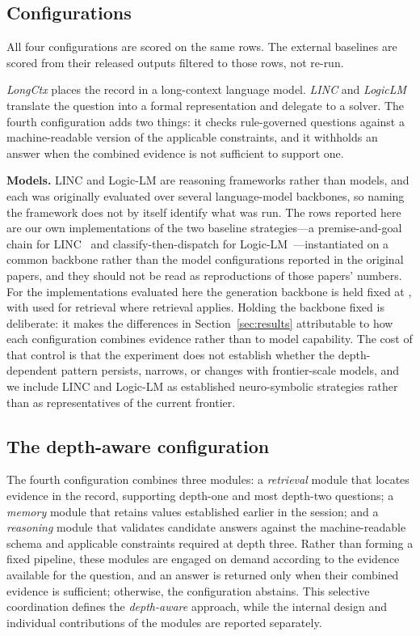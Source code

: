 \documentclass[conference]{IEEEtran}
\newcommand{\revg}[1]{\textcolor{reviewgreen}{#1}}
\begin{document}
\subsection{Configurations}
All four configurations are scored on the same \VerifiedN{} rows. The external
baselines are scored from their released outputs filtered to those rows, not
re-run.

\emph{LongCtx} places the record in a long-context language model.
\emph{LINC} and \emph{LogicLM} translate the question into a formal
representation and delegate to a solver. The fourth configuration adds two
things: it checks rule-governed questions against a machine-readable version of
the applicable constraints, and it withholds an answer when the combined
evidence is not sufficient to support one.

\textbf{Models.} LINC and Logic-LM are reasoning frameworks rather than
models, and each was originally evaluated over several language-model
backbones, so naming the framework does not by itself identify what was run.
The rows reported here are our own implementations of the two baseline strategies---a premise-and-goal chain for LINC~\cite{olausson2023linc} and classify-then-dispatch for Logic-LM~\cite{pan2023logiclm}---instantiated on a
common backbone rather than the model configurations reported in the original
papers, and they should not be read as reproductions of those papers' numbers.
For the implementations evaluated here the generation backbone is held fixed at
\GenModel{}, with \EmbedModel{} used for retrieval where retrieval applies.
Holding the backbone fixed is deliberate: it makes the differences in
Section~\ref{sec:results} attributable to how each configuration combines
evidence rather than to model capability. The cost of that control is that the
experiment does not establish whether the depth-dependent pattern persists,
narrows, or changes with frontier-scale models, and we include LINC and Logic-LM
as established neuro-symbolic strategies rather than as representatives of the
current frontier.

\subsection{The depth-aware configuration}
\label{sec:depthaware}
The fourth configuration combines three modules: a \emph{retrieval} module that locates evidence in the record, supporting depth-one and most depth-two questions; a \emph{memory} module that retains values established earlier in the session; and a \emph{reasoning} module that validates candidate answers against the machine-readable schema and applicable constraints required at depth three. Rather than forming a fixed pipeline, these modules are engaged on demand according to \revg{the evidence available for the question}, and an answer is returned only when their combined evidence is sufficient; otherwise, the configuration abstains. This selective coordination defines the \emph{depth-aware} approach, while the internal design and individual contributions of the modules are reported separately.
\end{document}
